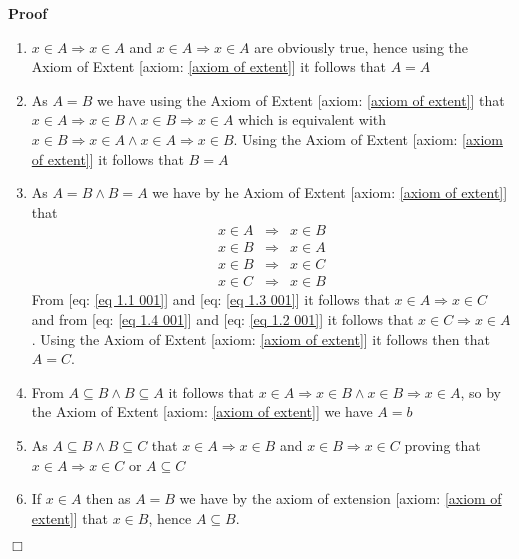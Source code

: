\documentclass{book}
\newenvironment{proof}{\noindent\textbf{Proof\ }}{\hspace*{\fill}$\Box$\medskip}
\begin{document}
\begin{proof}
  
  \begin{enumerate}
    \item $x \in A \Rightarrow x \in A$ and $x \in A \Rightarrow x \in A$ are
    obviously true, hence using the Axiom of Extent [axiom: \ref{axiom of
    extent}] it follows that $A = A$
    
    \item As $A = B$ we have using the Axiom of Extent [axiom: \ref{axiom of
    extent}] that $x \in A \Rightarrow x \in B \wedge x \in B \Rightarrow x
    \in A$ which is equivalent with $x \in B \Rightarrow x \in A \wedge x \in
    A \Rightarrow x \in B$. Using the Axiom of Extent [axiom: \ref{axiom of
    extent}] it follows that $B = A$
    
    \item As $A = B \wedge B = A$ we have by he Axiom of Extent [axiom:
    \ref{axiom of extent}] that
    \begin{eqnarray}
      x \in A & \Rightarrow & x \in B  \label{eq 1.1 001}\\
      x \in B & \Rightarrow & x \in A  \label{eq 1.2 001}\\
      x \in B & \Rightarrow & x \in C  \label{eq 1.3 001}\\
      x \in C & \Rightarrow & x \in B  \label{eq 1.4 001}
    \end{eqnarray}
    From [eq: \ref{eq 1.1 001}] and [eq: \ref{eq 1.3 001}] it follows that $x
    \in A \Rightarrow x \in C$ and from [eq: \ref{eq 1.4 001}] and [eq:
    \ref{eq 1.2 001}] it follows that $x \in C \Rightarrow x \in A$. Using the
    Axiom of Extent [axiom: \ref{axiom of extent}] it follows then that $A =
    C$.
    
    \item From $A \subseteq B \wedge B \subseteq A$ it follows that $x \in A
    \Rightarrow x \in B \wedge x \in B \Rightarrow x \in A$, so by the Axiom
    of Extent [axiom: \ref{axiom of extent}] we have $A = b$
    
    \item As $A \subseteq B \wedge B \subseteq C$ that $x \in A \Rightarrow x
    \in B$ and $x \in B \Rightarrow x \in C$ proving that $x \in A \Rightarrow
    x \in C$ or $A \subseteq C$
    
    \item If $x \in A$ then as $A = B$ we have by the axiom of extension
    [axiom: \ref{axiom of extent}] that $x \in B$, hence $A \subseteq B$.
  \end{enumerate}
  
\end{proof}
\end{document}
